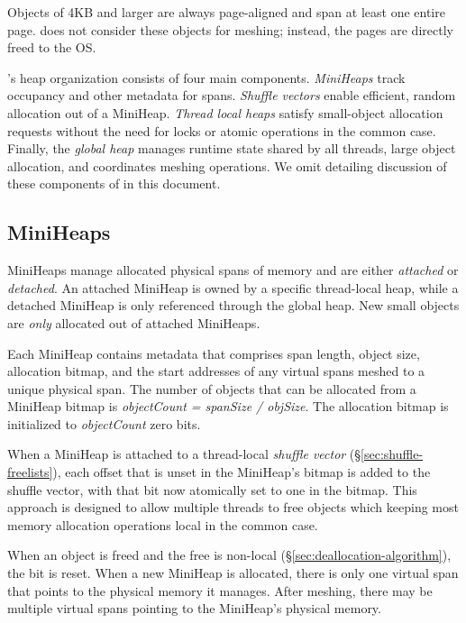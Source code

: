 Objects of 4KB and larger are always page-aligned and span at least one
entire page. \Mesh does not consider these objects for meshing;
instead, the pages are directly freed to the OS.

\Mesh's heap organization consists of four main components.
\emph{MiniHeaps} track occupancy and other metadata for spans.
\textit{Shuffle vectors} enable efficient,
random allocation out of a MiniHeap. %
\textit{Thread local heaps} satisfy small-object allocation requests
without the need for locks or atomic operations in the common case.
Finally, the \textit{global heap}
 manages runtime state shared by all threads,
large object allocation, and coordinates meshing operations.
We omit detailing discussion of these components of \Mesh in this document.


\iffalse

\subsection{MiniHeaps}
\label{sec:miniheaps}

MiniHeaps manage allocated physical spans of memory and are either
\emph{attached} or \emph{detached}.  An attached MiniHeap is owned by
a specific thread-local heap, while a detached MiniHeap is only
referenced through the global heap.  New small objects are
\textit{only} allocated out of attached MiniHeaps.

Each MiniHeap contains metadata that comprises span length, object
size, allocation bitmap, and the start addresses of any virtual spans
meshed to a unique physical span.  The number of objects that can be
allocated from a MiniHeap bitmap is \textit{objectCount = spanSize /
  objSize}.  The allocation bitmap is initialized to
\textit{objectCount} zero bits.

When a MiniHeap is attached to a
thread-local \emph{shuffle vector} (\S\ref{sec:shuffle-freelists}),
each offset that is unset in the MiniHeap's bitmap is added to the
shuffle vector, with that bit now atomically set to one in the bitmap.
This approach is designed to allow multiple threads to free objects
which keeping most memory allocation operations local in the common
case.

When an object is freed and the free is non-local
(\S\ref{sec:deallocation-algorithm}), the bit is reset.  When a new
MiniHeap is allocated, there is only one virtual span that points to
the physical memory it manages. After meshing, there may be multiple
virtual spans pointing to the MiniHeap's physical memory.


